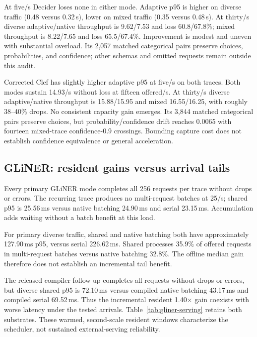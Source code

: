 \documentclass[10pt,twocolumn]{article}
\begin{document}
At five/s Decider loses none in either mode. Adaptive p95 is higher on diverse traffic (0.48 versus 0.32\,s), lower on mixed traffic (0.35 versus 0.48\,s). At thirty/s diverse adaptive/native throughput is 9.62/7.53 and loss 60.8/67.8\%; mixed throughput is 8.22/7.65 and loss 65.5/67.4\%. Improvement is modest and uneven with substantial overload. Its 2,057 matched categorical pairs preserve choices, probabilities, and confidence; other schemas and omitted requests remain outside this audit.

Corrected Clef has slightly higher adaptive p95 at five/s on both traces. Both modes sustain 14.93/s without loss at fifteen offered/s. At thirty/s diverse adaptive/native throughput is 15.88/15.95 and mixed 16.55/16.25, with roughly 38--40\% drops. No consistent capacity gain emerges. Its 3,844 matched categorical pairs preserve choices, but probability/confidence drift reaches 0.0065 with fourteen mixed-trace confidence-0.9 crossings. Bounding capture cost does not establish confidence equivalence or general acceleration.

\begin{table}[t]
\centering\small

\caption{Separate bounded-admission pilot at five offered requests/s, one validated worker per checkpoint. Diverse precedes mixed traffic with state retained. Decider runs native-first, corrected Clef adaptive-first. No confidence interval or pooling with the earlier serving study is implied.}
\label{tab:adaptive}
\end{table}

\subsection{GLiNER: resident gains versus arrival tails}
Every primary GLiNER mode completes all 256 requests per trace without drops or errors. The recurring trace produces no multi-request batches at 25/s; shared p95 is 25.56\,ms versus native batching 24.90\,ms and serial 23.15\,ms. Accumulation adds waiting without a batch benefit at this load.

For primary diverse traffic, shared and native batching both have approximately 127.90\,ms p95, versus serial 226.62\,ms. Shared processes 35.9\% of offered requests in multi-request batches versus native batching 32.8\%. The offline median gain therefore does not establish an incremental tail benefit.

The released-compiler follow-up completes all requests without drops or errors, but diverse shared p95 is 72.10\,ms versus compiled native batching 43.17\,ms and compiled serial 69.52\,ms. Thus the incremental resident 1.40$\times$ gain coexists with worse latency under the tested arrivals. Table~\ref{tab:gliner-serving} retains both substrates. These warmed, second-scale resident windows characterize the scheduler, not sustained external-serving reliability.
\end{document}
